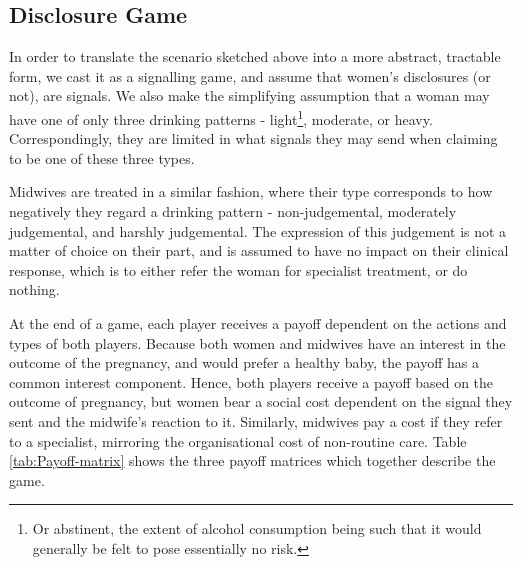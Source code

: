 \subsection{Disclosure Game}
\label{sub:the_game}

In order to translate the scenario sketched above into a more abstract, tractable form, we cast it as a signalling game, and assume that women's disclosures (or not), are signals. We also make the simplifying assumption that a woman may have one of only three drinking patterns - light\footnote{Or abstinent, the extent of alcohol consumption being such that it would generally be felt to pose essentially no risk.}, moderate, or heavy. Correspondingly, they are limited in what signals they may send when claiming to be one of these three types. 

Midwives are treated in a similar fashion, where their type corresponds to how negatively they regard a drinking pattern - non-judgemental, moderately judgemental, and harshly judgemental. The expression of this judgement is not a matter of choice on their part, and is assumed to have no impact on their clinical response, which is to either refer the woman for specialist treatment, or do nothing.

At the end of a game, each player receives a payoff dependent on the actions and types of both players. Because both women and midwives have an interest in the outcome of the pregnancy, and would prefer a healthy baby, the payoff has a common interest component. Hence, both players receive a payoff based on the outcome of pregnancy, but women bear a social cost dependent on the signal they sent and the midwife's reaction to it. Similarly, midwives pay a cost if they refer to a specialist, mirroring the organisational cost of non-routine care. Table \ref{tab:Payoff-matrix} shows the three payoff matrices which together describe the game.

